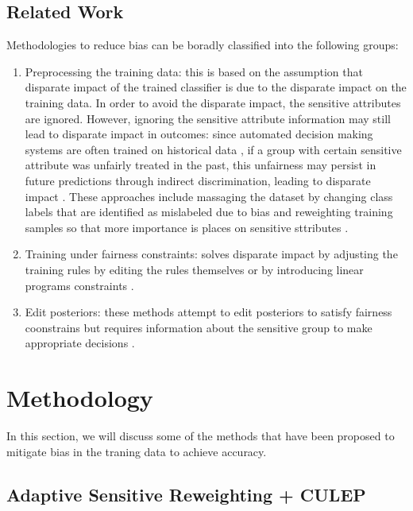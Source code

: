 \documentclass[runningheads]{llncs}
\begin{document}
\subsection{Related Work}
Methodologies to reduce bias can be boradly classified into the following groups:
\begin{enumerate}
\item Preprocessing the training data: this is based on the assumption that disparate impact of the trained classifier is due to the disparate impact on the training data. In order to avoid the disparate impact, the sensitive attributes are ignored. However, ignoring the sensitive attribute information may still lead to disparate impact in outcomes: since automated decision making systems are often trained on historical data , if a group with certain sensitive attribute was unfairly treated in the past, this unfairness may persist in future predictions through indirect discrimination, leading to disparate impact \cite{zafar2015fairness}. These approaches include massaging the dataset \cite{calders2009building} \cite{kamiran2009classifying} \cite{kamiran2012data} \cite{vzliobaite2011handling} by changing class labels that are identified as mislabeled due to bias and reweighting training samples so that more importance is places on sensitive sttributes \cite{calders2009building} \cite{kamiran2012data}.
\item Training under fairness constraints: solves disparate impact by adjusting the training rules by editing the rules themselves \cite{calders2013controlling} \cite{zafar2015fairness} or by introducing linear programs constraints \cite{celis2017ranking} \cite{dwork2012fairness} \cite{romei2014multidisciplinary} \cite{zafar2015fairness}.
\item Edit posteriors: these methods attempt to edit posteriors to satisfy fairness coonstrains but requires information about the sensitive group to make appropriate decisions \cite{dionne2014economic} \cite{doherty2012information} \cite{feldman2015computational} \cite{hardt2016equality}. 
\end{enumerate}
\section{Methodology}
In this section, we will discuss some of the methods that have been proposed to mitigate bias in the traning data to achieve accuracy.
\subsection{Adaptive Sensitive Reweighting + CULEP} 
\end{document}
